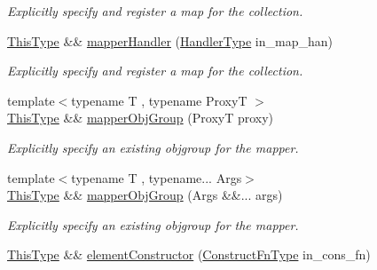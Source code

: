 \begin{DoxyCompactItemize}
\begin{DoxyCompactList}\small\item\em Explicitly specify and register a map for the collection. \end{DoxyCompactList}\item 
\hyperlink{structvt_1_1vrt_1_1collection_1_1param_1_1_construct_params_a13d4910c0f6825c7b0ddfebce5288bea}{This\+Type} \&\& \hyperlink{structvt_1_1vrt_1_1collection_1_1param_1_1_construct_params_a6e8498d29e4daaade3e4cb4b6dfa05de}{mapper\+Handler} (\hyperlink{namespacevt_af64846b57dfcaf104da3ef6967917573}{Handler\+Type} in\+\_\+map\+\_\+han)
\begin{DoxyCompactList}\small\item\em Explicitly specify and register a map for the collection. \end{DoxyCompactList}\item 
{\footnotesize template$<$typename T , typename ProxyT $>$ }\\\hyperlink{structvt_1_1vrt_1_1collection_1_1param_1_1_construct_params_a13d4910c0f6825c7b0ddfebce5288bea}{This\+Type} \&\& \hyperlink{structvt_1_1vrt_1_1collection_1_1param_1_1_construct_params_a7b87280234cb49d5732ac4224d0ecf31}{mapper\+Obj\+Group} (ProxyT proxy)
\begin{DoxyCompactList}\small\item\em Explicitly specify an existing objgroup for the mapper. \end{DoxyCompactList}\item 
{\footnotesize template$<$typename T , typename... Args$>$ }\\\hyperlink{structvt_1_1vrt_1_1collection_1_1param_1_1_construct_params_a13d4910c0f6825c7b0ddfebce5288bea}{This\+Type} \&\& \hyperlink{structvt_1_1vrt_1_1collection_1_1param_1_1_construct_params_abceacbbd603ff24555e8878a051fb81c}{mapper\+Obj\+Group} (Args \&\&... args)
\begin{DoxyCompactList}\small\item\em Explicitly specify an existing objgroup for the mapper. \end{DoxyCompactList}\item 
\hyperlink{structvt_1_1vrt_1_1collection_1_1param_1_1_construct_params_a13d4910c0f6825c7b0ddfebce5288bea}{This\+Type} \&\& \hyperlink{structvt_1_1vrt_1_1collection_1_1param_1_1_construct_params_a1a9710ed590f69867feccae0f432b724}{element\+Constructor} (\hyperlink{structvt_1_1vrt_1_1collection_1_1param_1_1_construct_params_a7ad7bdf4220701e54b485f45e08b1736}{Construct\+Fn\+Type} in\+\_\+cons\+\_\+fn)

\end{DoxyCompactItemize}
